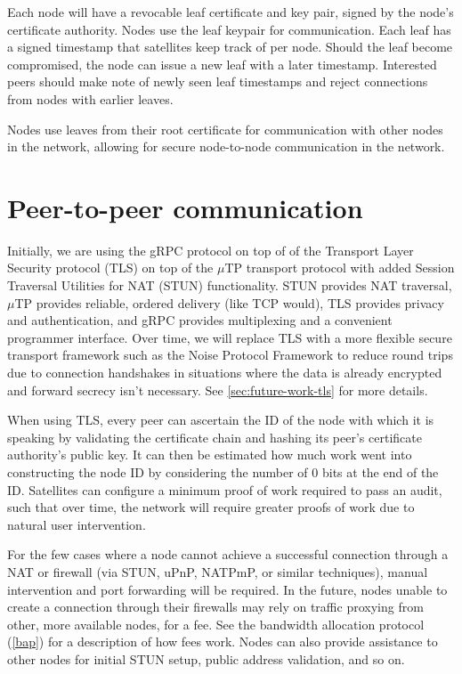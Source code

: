 \documentclass[11pt,fleqn,openany]{book}
\begin{document}
Each node will have a revocable leaf certificate and key pair, signed by
the node's certificate authority. Nodes use the leaf keypair for
communication. Each leaf has a signed timestamp that satellites
keep track of per node. Should the leaf become compromised, the node can issue
a new leaf with a later timestamp. Interested peers should make note of newly
seen leaf timestamps and reject connections from nodes with earlier leaves.

Nodes use leaves from their root certificate for communication with other
nodes in the network, allowing for secure node-to-node communication in the network.

\section{Peer-to-peer communication}

Initially, we are using the gRPC \cite{grpc} protocol on top of of the
Transport Layer Security protocol (TLS) on top of the $\mu$TP
\cite{utp} transport protocol with added Session Traversal Utilities for NAT
(STUN) functionality. STUN provides NAT traversal, $\mu$TP provides reliable,
ordered delivery (like TCP would), TLS provides privacy and authentication,
and gRPC provides multiplexing and a convenient programmer interface.
Over time, we will replace TLS with a more flexible secure transport
framework such as the Noise Protocol Framework \cite{noise-proto} to
reduce round trips due to connection handshakes in situations where the data is
already encrypted and forward secrecy isn't necessary. See
\ref{sec:future-work-tls} for more details.

When using TLS, every peer can ascertain the ID of the node with which it is
speaking by validating the certificate chain and hashing its peer's
certificate authority's public key. It can then be estimated how much work went
into constructing the node ID by considering the number of 0 bits at the end of
the ID. Satellites can configure a minimum proof of work required to pass an
audit, such that over time, the network will require greater proofs of work
due to natural user intervention.

For the few cases where a node cannot achieve a successful connection through a
NAT or firewall (via STUN, uPnP, NATPmP, or similar techniques), manual
intervention and port forwarding will be required. In the future, nodes unable
to create a connection through their firewalls may rely on traffic proxying from
other, more available nodes, for a fee. See the bandwidth allocation protocol
(\ref{bap}) for a description of how fees work. Nodes can also provide
assistance to other nodes for initial STUN setup, public address validation,
and so on.
\end{document}
